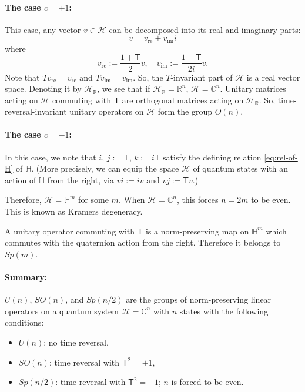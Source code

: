 \documentclass[12pt]{article}
\numberwithin{equation}{section}
\numberwithin{figure}{section}
\theoremstyle{remark}
\def\bC{\mathbb{C}}
\def\bH{\mathbb{H}}
\def\bR{\mathbb{R}}
\def\cH{\mathcal{H}}
\def\sT{\mathsf{T}}
\begin{document}
 \paragraph{The case $c=+1$:}
 This case, any vector $v\in \cH$ can be decomposed into its real and imaginary parts:
  \begin{equation}
    v = v_\text{re} + v_\text{im} i 
  \end{equation}
  where
  \begin{equation}
    v_\text{re}:= \frac{1+\sT}{2} v, \quad v_\text{im}:=\frac{1-\sT}{2i}v .
  \end{equation}
  Note that $T v_\text{re}= v_\text{re}$ and $T v_\text{im}=v_\text{im}$.
So, the $T$-invariant part of $\cH$ is a real vector space.
Denoting it by $\cH_\bR$, we see that if $\cH_\bR=\bR^n$, $\cH=\bC^n$.
Unitary matrices acting on $\cH$ commuting with $\sT$
are orthogonal matrices acting on $\cH_\bR$.
So, time-reversal-invariant unitary operators on $\cH$ 
form the group $O(n)$.

\paragraph{The case $c=-1$:}
In this case, we note that $i$, $j:=\sT$, $k:=i \sT$ satisfy 
the defining relation \eqref{eq:rel-of-H} of $\bH$.
(More precisely, we can equip the space $\cH$ of quantum states
with an action of $\bH$ from the right, via $vi := iv$ and $vj:=\sT v$.)

Therefore, $\cH= \bH^m$ for some $m$. When $\cH=\bC^n$, this forces $n=2m$ to be even.
This is known as Kramers degeneracy.

A unitary operator commuting with $\sT$
is a norm-preserving map on $\bH^m$ which commutes with the quaternion action from the right.
Therefore it belongs to $Sp(m)$.

\paragraph{Summary:}
$U(n)$, $SO(n)$, and $Sp(n/2)$ are the groups of norm-preserving linear operators
on a quantum system $\cH=\bC^n$ with $n$ states with the following conditions:
\begin{itemize}
\item $U(n)$: no time reversal,
\item $SO(n)$: time reversal with $\sT^2=+1$,
\item $Sp(n/2)$: time reversal with $\sT^2=-1$; $n$ is forced to be even.
\end{itemize}
\end{document}
